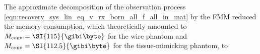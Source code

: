 The approximate decomposition of
the observation process
\eqref{eqn:recovery_sys_lin_eq_v_rx_born_all_f_all_in_mat} by
the \ac{FMM} reduced
the memory consumption, which theoretically amounted to
$M_{\text{conv}} = \SI{115}{\gibi\byte}$ for
the wire phantom and
$M_{\text{conv}} = \SI{112.5}{\gibi\byte}$ for
the tissue-mimicking phantom, to
